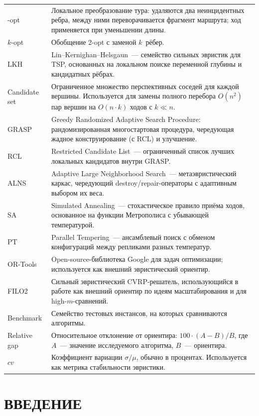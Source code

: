 \documentclass[14pt,a4paper]{extarticle}
\begin{document}
\begin{longtable}{>{\raggedright\arraybackslash}p{}>{\raggedright\arraybackslash}p{}}
2-opt & Локальное преобразование тура: удаляются два неинцидентных ребра, между ними переворачивается фрагмент маршрута; ход применяется при уменьшении длины.\\
$k$-opt & Обобщение 2-opt с заменой $k$~рёбер.\\
LKH & Lin--Kernighan--Helsgaun~--- семейство сильных эвристик для TSP, основанных на локальном поиске переменной глубины и кандидатных рёбрах.\\
Candidate set & Ограниченное множество перспективных соседей для каждой вершины. Используется для замены полного перебора $O(n^2)$ пар вершин на $O(n \cdot k)$ ходов с $k \ll n$.\\
GRASP & Greedy Randomized Adaptive Search Procedure: рандомизированная многостартовая процедура, чередующая жадное конструирование (с RCL) и улучшение.\\
RCL & Restricted Candidate List~--- ограниченный список лучших локальных кандидатов внутри GRASP.\\
ALNS & Adaptive Large Neighborhood Search~--- метаэвристический каркас, чередующий destroy/repair-операторы с адаптивным выбором их веса.\\
SA & Simulated Annealing~--- стохастическое правило приёма ходов, основанное на функции Метрополиса с убывающей температурой.\\
PT & Parallel Tempering~--- ансамблевый поиск с обменом конфигураций между репликами разных температур.\\
OR-Tools & Open-source-библиотека Google для задач оптимизации; используется как внешний эвристический ориентир.\\
FILO2 & Сильный эвристический CVRP-решатель, использующийся в работе как внешний ориентир по идеям масштабирования и для high-$m$-сравнений.\\
Benchmark & Семейство тестовых инстансов, на которых сравниваются алгоритмы.\\
Relative gap & Относительное отклонение от ориентира: $100 \cdot (A - B)/B$, где $A$~--- значение исследуемого алгоритма, $B$~--- ориентира.\\
$cv$ & Коэффициент вариации $\sigma/\mu$, обычно в процентах. Используется как метрика стабильности эвристики.\\
\bottomrule
\end{longtable}

\newpage
\section*{ВВЕДЕНИЕ}
\end{document}
